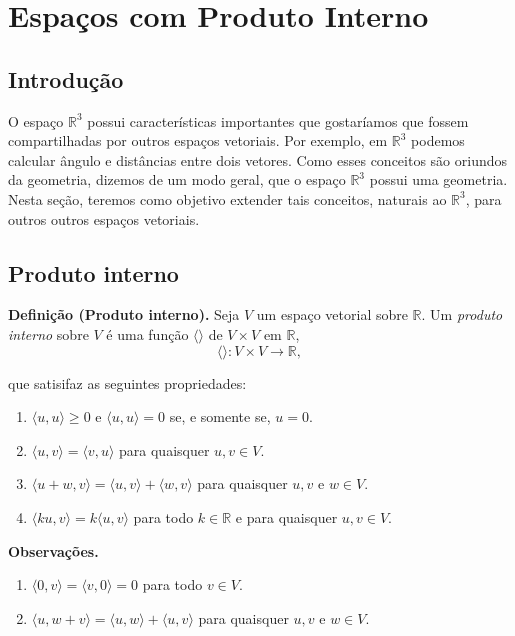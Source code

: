 \chapter{Espaços com Produto Interno}
\thispagestyle{empty}

\section{Introdução}

O espaço $\mathbb{R}^3$  possui características importantes que gostaríamos que fossem compartilhadas por outros espaços vetoriais. Por exemplo,  em $\mathbb{R}^3$ podemos calcular ângulo e distâncias entre dois vetores.  Como esses conceitos são oriundos da geometria, dizemos de um modo geral, que o espaço $\mathbb{R}^3$ possui uma geometria.  Nesta seção, teremos como objetivo extender tais conceitos, naturais ao $\mathbb{R}^3$, para outros outros espaços vetoriais.

\section{Produto interno}


\textbf{Definição (Produto interno).} Seja $V$ um espaço vetorial sobre $\mathbb{R}$. Um \textit{produto interno} sobre $V$ é uma função $\langle \rangle$ de $V \times V$ em $\mathbb{R}$,  $$\langle \rangle : V\times V \rightarrow \mathbb{R}, $$


que satisifaz as seguintes propriedades:

\begin{enumerate}[label=(\roman*)]%
\item  $\langle u, u\rangle  \geq 0$  e  $\langle u, u \rangle = 0$  se, e somente se, $u=0$.
\item  $\langle u, v\rangle  = \langle v, u \rangle$ para quaisquer $u, v \in V$.
\item $\langle u+w, v\rangle  = \langle u, v \rangle + \langle w, v \rangle $ para quaisquer $u, v $ e $ w \in V$.
\item $\langle k u, v \rangle = k \langle  u, v \rangle$ para todo $ k \in \mathbb{R}$ e para quaisquer $ u, v \in V$.
\end{enumerate}



\vspace{0.7cm}
\noindent \textbf{Observações.}

\begin{enumerate}
\item   $\langle 0, v\rangle  = \langle v, 0 \rangle=0$ para todo $v \in V$.

\item   $\langle u, w+v\rangle  = \langle u, w \rangle + \langle u, v \rangle $ para quaisquer $u, v $ e $ w \in V$.
\end{enumerate}

